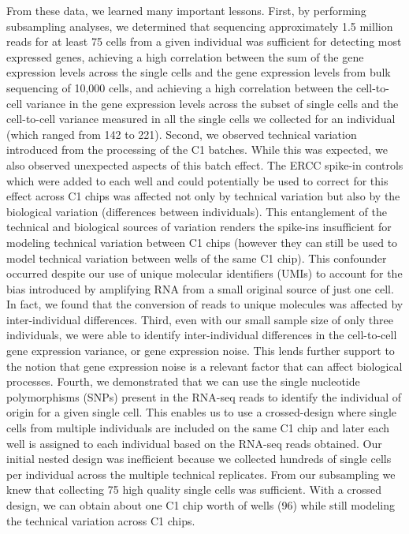 From these data, we learned many important lessons. First, by
performing subsampling analyses, we determined that sequencing
approximately 1.5 million reads for at least 75 cells from a given
individual was sufficient for detecting most expressed genes,
achieving a high correlation between the sum of the gene expression
levels across the single cells and the gene expression levels from
bulk sequencing of 10,000 cells, and achieving a high correlation
between the cell-to-cell variance in the gene expression levels across
the subset of single cells and the cell-to-cell variance measured in
all the single cells we collected for an individual (which ranged from
142 to 221). Second, we observed technical variation introduced from
the processing of the C1 batches. While this was expected, we also
observed unexpected aspects of this batch effect. The ERCC spike-in
controls which were added to each well and could potentially be used
to correct for this effect across C1 chips was affected not only by
technical variation but also by the biological variation (differences
between individuals). This entanglement of the technical and
biological sources of variation renders the spike-ins insufficient for
modeling technical variation between C1 chips (however they can still
be used to model technical variation between wells of the same C1
chip). This confounder occurred despite our use of unique molecular
identifiers (UMIs) to account for the bias introduced by amplifying
RNA from a small original source of just one cell. In fact, we found
that the conversion of reads to unique molecules was affected by
inter-individual differences. Third, even with our small sample size
of only three individuals, we were able to identify inter-individual
differences in the cell-to-cell gene expression variance, or gene
expression noise. This lends further support to the notion that gene
expression noise is a relevant factor that can affect biological
processes. Fourth, we demonstrated that we can use the single
nucleotide polymorphisms (SNPs) present in the RNA-seq reads to
identify the individual of origin for a given single cell. This
enables us to use a crossed-design where single cells from multiple
individuals are included on the same C1 chip and later each well is
assigned to each individual based on the RNA-seq reads obtained. Our
initial nested design was inefficient because we collected hundreds of
single cells per individual across the multiple technical
replicates. From our subsampling we knew that collecting 75 high
quality single cells was sufficient. With a crossed design, we can
obtain about one C1 chip worth of wells (96) while still modeling the
technical variation across C1 chips.


